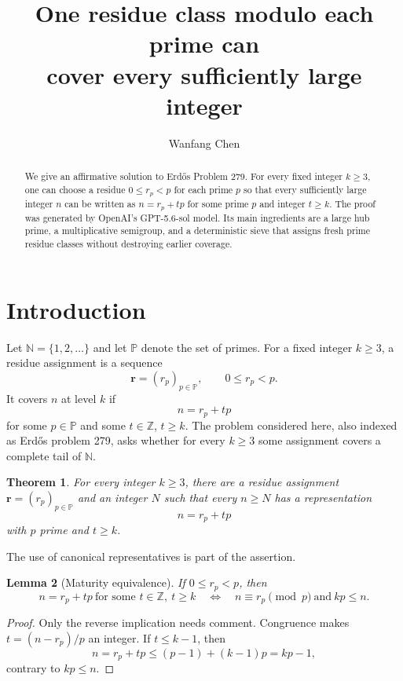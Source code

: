 \documentclass[10pt]{amsart}
\title[One prime residue class covering a tail]
{One residue class modulo each prime can\\
cover every sufficiently large integer}
\author{Wanfang Chen}
\date{}
\numberwithin{equation}{section}
\newcommand{\N}{\mathbb N}
\newcommand{\Z}{\mathbb Z}
\newcommand{\PP}{\mathbb P}
\newtheorem{theorem}{Theorem}[section]
\newtheorem{lemma}[theorem]{Lemma}
\theoremstyle{remark}
\begin{document}
\begin{abstract}
We give an affirmative solution to Erd\H{o}s Problem 279. For every fixed
integer \(k\ge 3\), one can choose a residue \(0\le r_p<p\) for each prime
\(p\) so that every sufficiently large integer \(n\) can be written as
\(n=r_p+tp\) for some prime \(p\) and integer \(t\ge k\). The proof was
generated by OpenAI's GPT-5.6-sol model. Its main ingredients are a large
hub prime, a multiplicative semigroup, and a deterministic sieve that assigns
fresh prime residue classes without destroying earlier coverage.
\end{abstract}

\maketitle

\section{Introduction}

Let \(\N=\{1,2,\ldots\}\) and let \(\PP\) denote the set of primes. For a
fixed integer \(k\ge3\), a residue assignment is a sequence
\[
  \boldsymbol r=(r_p)_{p\in\PP},\qquad 0\le r_p<p.
\]
It covers \(n\) at level \(k\) if
\[
  n=r_p+tp
\]
for some \(p\in\PP\) and some \(t\in\Z\), \(t\ge k\). The problem considered
here, also indexed as Erd\H{o}s problem 279, asks whether for every \(k\ge3\)
some assignment covers a complete tail of \(\N\).

\begin{theorem}\label{thm:main}
For every integer \(k\ge3\), there are a residue assignment
\(\boldsymbol r=(r_p)_{p\in\PP}\) and an integer \(N\) such that every
\(n\ge N\) has a representation
\[
  n=r_p+tp
\]
with \(p\) prime and \(t\ge k\).
\end{theorem}

The use of canonical representatives is part of the assertion.

\begin{lemma}[Maturity equivalence]\label{lem:maturity}
If \(0\le r_p<p\), then
\[
 n=r_p+tp\ \text{for some }t\in\Z,\ t\ge k
 \quad\Longleftrightarrow\quad
 n\equiv r_p\pmod p\ \text{and}\ kp\le n.
\]
\end{lemma}

\begin{proof}
Only the reverse implication needs comment. Congruence makes
\(t=(n-r_p)/p\) an integer. If \(t\le k-1\), then
\[
 n=r_p+tp\le(p-1)+(k-1)p=kp-1,
\]
contrary to \(kp\le n\).
\end{proof}
\end{document}
